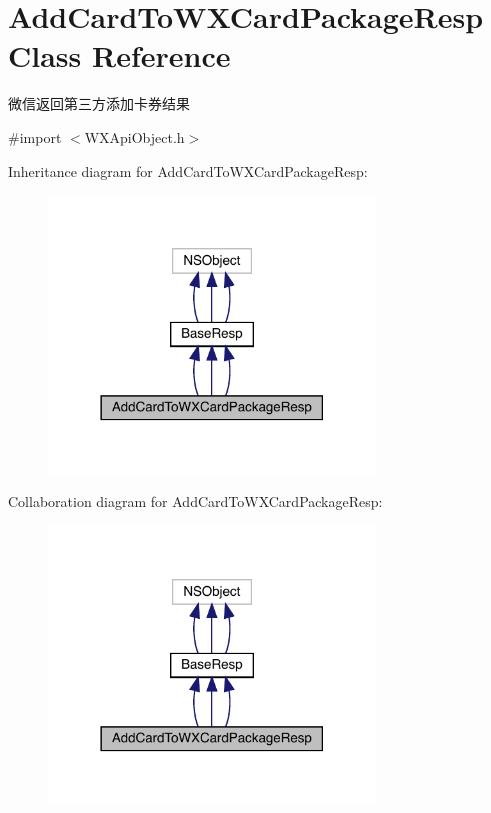 \hypertarget{interface_add_card_to_w_x_card_package_resp}{}\section{Add\+Card\+To\+W\+X\+Card\+Package\+Resp Class Reference}
\label{interface_add_card_to_w_x_card_package_resp}


微信返回第三方添加卡券结果  




{\ttfamily \#import $<$W\+X\+Api\+Object.\+h$>$}



Inheritance diagram for Add\+Card\+To\+W\+X\+Card\+Package\+Resp\+:\nopagebreak
\begin{figure}[H]
\begin{center}
\leavevmode
\includegraphics[width=246pt]{interface_add_card_to_w_x_card_package_resp__inherit__graph}
\end{center}
\end{figure}


Collaboration diagram for Add\+Card\+To\+W\+X\+Card\+Package\+Resp\+:\nopagebreak
\begin{figure}[H]
\begin{center}
\leavevmode
\includegraphics[width=246pt]{interface_add_card_to_w_x_card_package_resp__coll__graph}
\end{center}
\end{figure}

